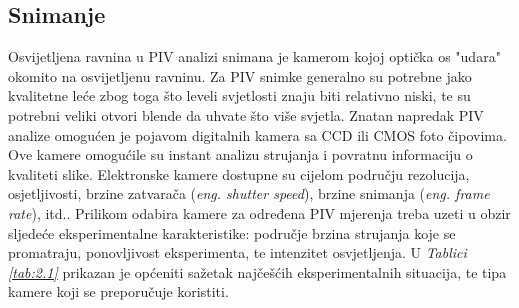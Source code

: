 \subsection{Snimanje}
Osvijetljena ravnina u PIV analizi snimana je kamerom kojoj optička os "udara" okomito na osvijetljenu ravninu. Za PIV snimke generalno su potrebne jako kvalitetne leće zbog toga što leveli svjetlosti znaju biti relativno niski, te su potrebni veliki otvori blende da uhvate što više svjetla. Znatan napredak PIV analize omogućen je pojavom digitalnih kamera sa CCD ili CMOS foto čipovima. Ove kamere omogućile su instant analizu strujanja i povratnu informaciju o kvaliteti slike. Elektronske kamere dostupne su cijelom području rezolucija, osjetljivosti, brzine zatvarača (\textit{eng. shutter speed}), brzine snimanja (\textit{eng. frame rate}), itd.. Prilikom odabira kamere za određena PIV mjerenja treba uzeti u obzir sljedeće eksperimentalne karakteristike: područje brzina strujanja koje se promatraju, ponovljivost eksperimenta, te intenzitet osvjetljenja. U \textit{Tablici \ref{tab:2.1}} prikazan je općeniti sažetak najčešćih eksperimentalnih situacija, te tipa kamere koji se preporučuje koristiti.
